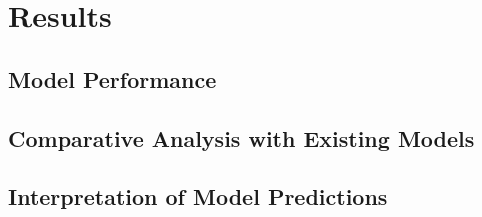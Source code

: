 \section*{Results}

\subsection{Model Performance}
\label{sec:Model Performance}

\subsection{Comparative Analysis with Existing Models}
\label{sec:Comparative Analysis with Existing Models}

\subsection{Interpretation of Model Predictions}
\label{sec:Interpretation of Model Predictions}